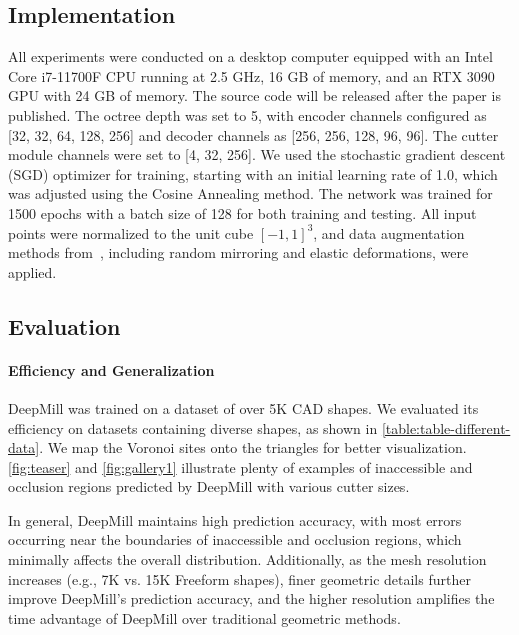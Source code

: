 \subsection{Implementation}
All experiments were conducted on a desktop computer equipped with an Intel Core i7-11700F CPU running at 2.5 GHz, 16 GB of memory, and an RTX 3090 GPU with 24 GB of memory. The source code will be released after the paper is published. The octree depth was set to 5, with encoder channels configured as [32, 32, 64, 128, 256] and decoder channels as [256, 256, 128, 96, 96]. The cutter module channels were set to [4, 32, 256]. We used the stochastic gradient descent (SGD) optimizer for training, starting with an initial learning rate of 1.0, which was adjusted using the Cosine Annealing method. The network was trained for 1500 epochs with a batch size of 128 for both training and testing. All input points were normalized to the unit cube $[-1, 1]^3$, and data augmentation methods from~\cite{choy20194d}, including random mirroring and elastic deformations, were applied.




\subsection{Evaluation}
\paragraph{Efficiency and Generalization}
DeepMill was trained on a dataset of over 5K CAD shapes.
We evaluated its efficiency on datasets containing diverse shapes, as shown in \autoref{table:table-different-data}.
We map the Voronoi sites onto the triangles for better visualization.
\autoref{fig:teaser} and \autoref{fig:gallery1} illustrate plenty of examples of inaccessible and occlusion regions predicted by DeepMill with various cutter sizes.


In general, DeepMill maintains high prediction accuracy, with most errors occurring near the boundaries of inaccessible and occlusion regions, which minimally affects the overall distribution.
Additionally, as the mesh resolution increases (e.g., 7K vs. 15K Freeform shapes), finer geometric details further improve DeepMill's prediction accuracy, and the higher resolution amplifies the time advantage of DeepMill over traditional geometric methods.


